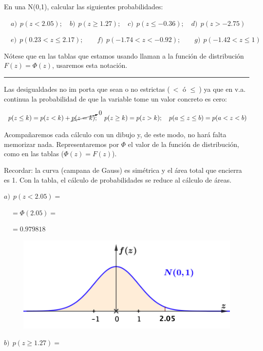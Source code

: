 \begin{ejemplo}


\vspace{4mm} \begin{ejre}
En una N(0,1), calcular las siguientes probabilidades:

$\quad a)\ \ p(z<2.05);\quad b)\ \ p(z\ge 1.27); \quad c)\ \ p(z\le -0.36);\quad d)\ \ p(z> -2.75)$

$\quad e)\ \ p(0.23<z\le 2.17);\qquad f)\ \ p(-1.74<z<-0.92);\qquad g)\ \ p(-1.42<z \le 1)$

\scriptsize{Nótese que en las tablas que estamos usando llaman a la función de distribución $F(z)=\Phi(z)$, usaremos esta notación}\normalsize{.}

\rule{250pt}{0.1pt}

Las desigualdades no im porta que sean o no estrictas ($\ < \text{ ó } \le \ $) ya que en v.a. continua la probabilidad de que la variable tome un valor concreto es cero: 

$$\ p(z\le k)= p(z<k)+\cancelto{0}{p(z=k)};\quad p(z\ge k)=p(z>k); \quad p(a\le z\le b)=p(a<z<b)$$

Acompañaremos cada cálculo con un dibujo y, de este modo, no hará falta memorizar nada. Representaremos por $\Phi$ el valor de la función de distribución, como en las tablas ($\Phi(z)=F(z)$).

Recordar: la curva (campana de Gauss) es simétrica y el área total que encierra es 1. Con la tabla, el cálculo de probabilidades se reduce al cálculo de áreas.
 
 \begin{multicols}{2}
 $a)\ \ p(z<2.05)=$
 
 $\quad =\Phi(2.05)=$
 
 $\quad =0.979818$
 
 \begin{figure}[H]
	\centering
	\includegraphics[width=.5\textwidth]{imagenes/imagenes04/T04IM18.png}
	\end{figure}
 	
 \end{multicols}
 
 \begin{multicols}{2}
 $b)\ \ p(z\ge 1.27)=$
 

\end{multicols}
\end{ejre}
\end{ejemplo}
